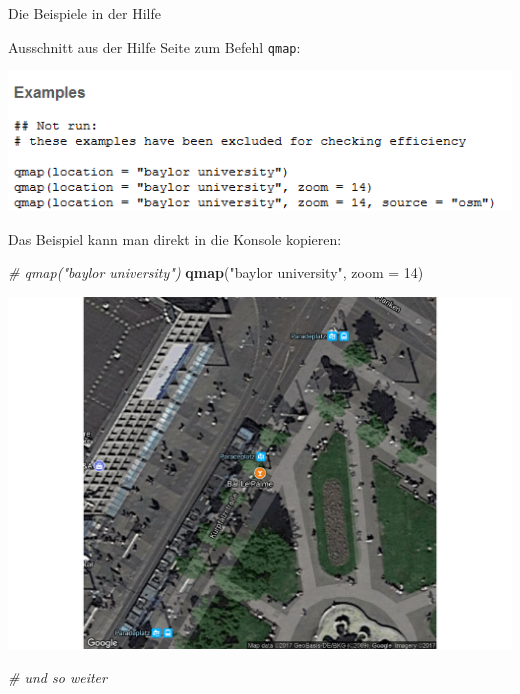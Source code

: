 \documentclass[ignorenonframetext,]{beamer}
\newenvironment{Shaded}{}{}
\newcommand{\KeywordTok}[1]{\textcolor[rgb]{0.00,0.44,0.13}{\textbf{{#1}}}}
\newcommand{\DataTypeTok}[1]{\textcolor[rgb]{0.56,0.13,0.00}{{#1}}}
\newcommand{\DecValTok}[1]{\textcolor[rgb]{0.25,0.63,0.44}{{#1}}}
\newcommand{\StringTok}[1]{\textcolor[rgb]{0.25,0.44,0.63}{{#1}}}
\newcommand{\CommentTok}[1]{\textcolor[rgb]{0.38,0.63,0.69}{\textit{{#1}}}}
\newcommand{\NormalTok}[1]{{#1}}
\begin{document}
\begin{frame}[fragile]{Die Beispiele in der Hilfe}

Ausschnitt aus der Hilfe Seite zum Befehl \texttt{qmap}:

\includegraphics{./tex2pdf.956/49a33a1653041480fa66729550047b3b586c59da.png}

Das Beispiel kann man direkt in die Konsole kopieren:

\begin{Shaded}
\begin{Highlighting}[]
\CommentTok{# qmap("baylor university")}
\KeywordTok{qmap}\NormalTok{(}\StringTok{"baylor university"}\NormalTok{, }\DataTypeTok{zoom =} \DecValTok{14}\NormalTok{)}
\end{Highlighting}
\end{Shaded}

\includegraphics{R_intern_files/figure-beamer/unnamed-chunk-263-1.pdf}

\begin{Shaded}
\begin{Highlighting}[]
\CommentTok{# und so weiter}
\end{Highlighting}
\end{Shaded}

\end{frame}
\end{document}
